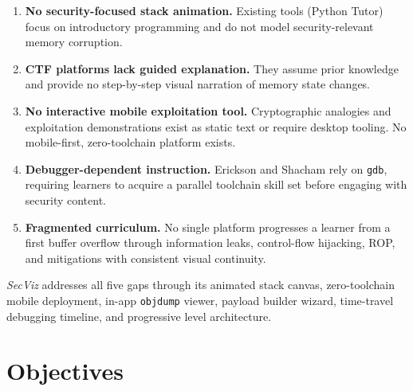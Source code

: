 \documentclass[12pt,a4paper]{article}
\newcommand{\SV}{\textit{SecViz}}
\begin{document}
\begin{enumerate}[leftmargin=1.5em, itemsep=4pt]
    \item \textbf{No security-focused stack animation.} Existing tools (Python Tutor)
    focus on introductory programming and do not model security-relevant memory
    corruption.
    \item \textbf{CTF platforms lack guided explanation.} They assume prior knowledge
    and provide no step-by-step visual narration of memory state changes.
    \item \textbf{No interactive mobile exploitation tool.} Cryptographic analogies
    and exploitation demonstrations exist as static text or require desktop tooling.
    No mobile-first, zero-toolchain platform exists.
    \item \textbf{Debugger-dependent instruction.} Erickson and Shacham rely on
    \texttt{gdb}, requiring learners to acquire a parallel toolchain skill set before
    engaging with security content.
    \item \textbf{Fragmented curriculum.} No single platform progresses a learner
    from a first buffer overflow through information leaks, control-flow hijacking,
    ROP, and mitigations with consistent visual continuity.
\end{enumerate}

\SV{} addresses all five gaps through its animated stack canvas, zero-toolchain
mobile deployment, in-app \texttt{objdump} viewer, payload builder wizard,
time-travel debugging timeline, and progressive level architecture.

\section{Objectives}
\end{document}
